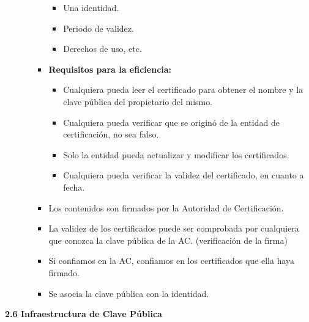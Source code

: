 \documentclass[12pt, twoside, openright]{report} %
\begin{document}
\begin{itemize}
\begin{itemize}
\begin{itemize}
        \begin{itemize}
        \item Una identidad.
          
        \item Periodo de validez.
          
        \item Derechos de uso, etc.
          
        \end{itemize}
      \item \textbf{Requisitos para la eficiencia:}
        

        \begin{itemize}
        \item Cualquiera pueda leer el certificado para obtener el nombre y
          la clave pública del propietario del mismo.
          
        \item Cualquiera pueda verificar que se originó de la entidad de
          certificación, no sea falso.
          
        \item Solo la entidad pueda actualizar y modificar los certificados.
          
        \item Cualquiera pueda verificar la validez del certificado, en
          cuanto a fecha.
          
        \end{itemize}
      \item Los contenidos son firmados por la Autoridad de Certificación.
        
      \item La validez de los certificados puede ser comprobada por
        cualquiera que conozca la clave pública de la AC. (verificación
        de la firma)
        
      \item Si confiamos en la AC, confiamos en los certificados que ella
        haya firmado.
        
      \item Se asocia la clave pública con la identidad.
        
      \end{itemize}
    \end{itemize}
  \end{itemize}

  
  \textbf{2.6 Infraestructura de Clave Pública}
  
\end{document}
